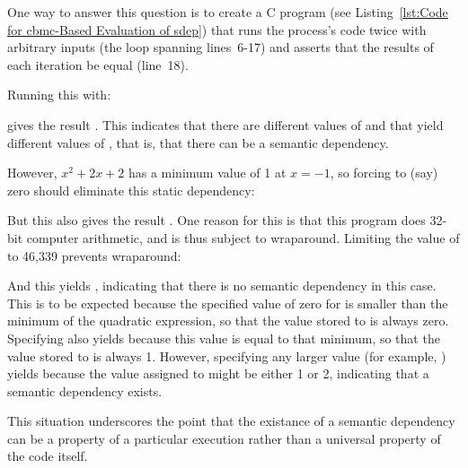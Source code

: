 \documentclass[10]{article}
\begin{document}
One way to answer this question is to create a C program
(see Listing~\ref{lst:Code for cbmc-Based Evaluation of sdep})
that runs the  process's code twice with arbitrary inputs
(the loop spanning lines~6-17) and asserts that the results of
each iteration be equal (line~18).

Running this with:

\begin{quote}
	\scriptsize
\end{quote}

gives the result .
This indicates that there are different values of  and 
that yield different values of , that is, that there can be
a semantic dependency.

However, $x^2 + 2x + 2$ has a minimum value of 1 at $x=-1$, so
forcing  to (say) zero should eliminate this static
dependency:

\begin{quote}
	\scriptsize
\end{quote}

But this also gives the result .
One reason for this is that this program does 32-bit computer arithmetic,
and is thus subject to wraparound.
Limiting the value of  to 46,339 prevents wraparound:

\begin{quote}
	\scriptsize
\end{quote}

And this yields , indicating that there
is no semantic dependency in this case.
This is to be expected because the specified value of zero for 
is smaller than the minimum of the quadratic expression, so that the
value stored to  is always zero.
Specifying  also yields 
because this value is equal to that minimum, so that the value stored to
 is always 1.
However, specifying any larger value (for example, )
yields  because the value assigned to 
might be either 1 or 2, indicating that a semantic dependency exists.

This situation underscores the point that the existance of a semantic
dependency can be a property of a particular execution rather than a
universal property of the code itself.
\end{document}
